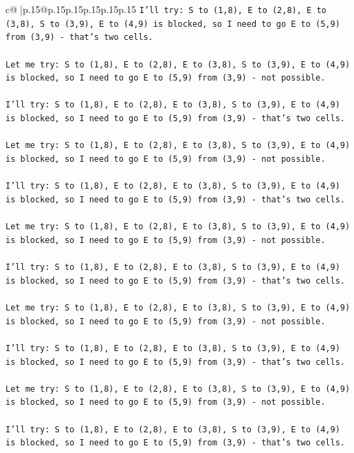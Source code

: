 \documentclass{article}
\begin{document}
{\begin{supertabular}{c@{$\;$}|p{.15\linewidth}@{}p{.15\linewidth}p{.15\linewidth}p{.15\linewidth}p{.15\linewidth}p{.15\linewidth}}
{{{\texttt{I'll try: S to (1,8), E to (2,8), E to (3,8), S to (3,9), E to (4,9) is blocked, so I need to go E to (5,9) from (3,9) {-} that's two cells. } \\
\\ 
\texttt{Let me try: S to (1,8), E to (2,8), E to (3,8), S to (3,9), E to (4,9) is blocked, so I need to go E to (5,9) from (3,9) {-} not possible. } \\
\\ 
\texttt{I'll try: S to (1,8), E to (2,8), E to (3,8), S to (3,9), E to (4,9) is blocked, so I need to go E to (5,9) from (3,9) {-} that's two cells. } \\
\\ 
\texttt{Let me try: S to (1,8), E to (2,8), E to (3,8), S to (3,9), E to (4,9) is blocked, so I need to go E to (5,9) from (3,9) {-} not possible. } \\
\\ 
\texttt{I'll try: S to (1,8), E to (2,8), E to (3,8), S to (3,9), E to (4,9) is blocked, so I need to go E to (5,9) from (3,9) {-} that's two cells. } \\
\\ 
\texttt{Let me try: S to (1,8), E to (2,8), E to (3,8), S to (3,9), E to (4,9) is blocked, so I need to go E to (5,9) from (3,9) {-} not possible. } \\
\\ 
\texttt{I'll try: S to (1,8), E to (2,8), E to (3,8), S to (3,9), E to (4,9) is blocked, so I need to go E to (5,9) from (3,9) {-} that's two cells. } \\
\\ 
\texttt{Let me try: S to (1,8), E to (2,8), E to (3,8), S to (3,9), E to (4,9) is blocked, so I need to go E to (5,9) from (3,9) {-} not possible. } \\
\\ 
\texttt{I'll try: S to (1,8), E to (2,8), E to (3,8), S to (3,9), E to (4,9) is blocked, so I need to go E to (5,9) from (3,9) {-} that's two cells. } \\
\\ 
\texttt{Let me try: S to (1,8), E to (2,8), E to (3,8), S to (3,9), E to (4,9) is blocked, so I need to go E to (5,9) from (3,9) {-} not possible. } \\
\\ 
\texttt{I'll try: S to (1,8), E to (2,8), E to (3,8), S to (3,9), E to (4,9) is blocked, so I need to go E to (5,9) from (3,9) {-} that's two cells. } \\
\\ 
}}}
\end{supertabular}}
\end{document}
